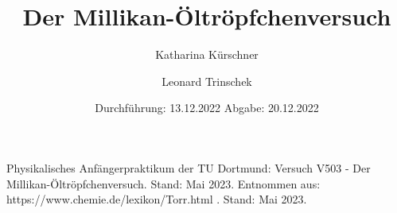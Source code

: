 

\subject{V503}
\title{Der Millikan-Öltröpfchenversuch}
\date{
  Durchführung: 13.12.2022
  \hspace{3em}
  Abgabe: 20.12.2022
}
\author{Katharina Kürschner \and Leonard Trinschek}



\maketitle
\thispagestyle{empty}
\tableofcontents
\newpage








\newpage

\begin{thebibliography}{9}
   Physikalisches Anfängerpraktikum der TU Dortmund: Versuch V503 -   Der Millikan-Öltröpfchenversuch. Stand: Mai 2023.
   Entnommen aus: https://www.chemie.de/lexikon/Torr.html . Stand: Mai 2023.
\end{thebibliography}


